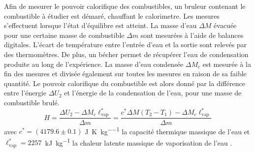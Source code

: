 Afin de mesurer le pouvoir calorifique des combustibles, un bruleur contenant le combustible à étudier est démaré, chauffant le calorimetre. Les mesures s'effectuent lorsque l'état d'équilibre est atteint. La masse d'eau \(\Delta M\) évacuée pour une certaine masse de combustible \(\Delta m\) sont mesurées à l'aide de balances digitales. L'écart de température entre l'entrée d'eau et la sortie sont relevés par des thermomètres. De plus, un bécher permet de récupérer l'eau de condensation produite au long de l'expérience. La masse d'eau condensée \(\Delta M_c\) est mesurée à la fin des mesures et divisée également sur toutes les mesures en raison de sa faible quantité. Le pouvoir calorifique du combustible est alors donné par la différence entre l'énergie \(\Delta U_2\) et l'énergie de la condensation de l'eau, pour une masse de combustible brulé.
\begin{equation}
    H = \frac{\Delta U_2 - \Delta M_c \ell_\textrm{vap}^*}{\Delta m} = \frac{c^* \Delta M (T_2 - T_1) - \Delta M_c \ell_\textrm{vap}^*}{\Delta m}
    \label{eq:pouvoir_calorifique}
\end{equation}
avec \(c^* = (4179.6 \pm 0.1)\) \si{\joule\per\kelvin\per\kilo\gram} la capacité thermique massique de l'eau \cite{capacite-eau} et \mbox{\(\ell_\textrm{vap}^* = 2257\) \si{\kilo\joule\per\kilo\gram}} la chaleur latente massique de vaporisation de l'eau \cite{notice}.
